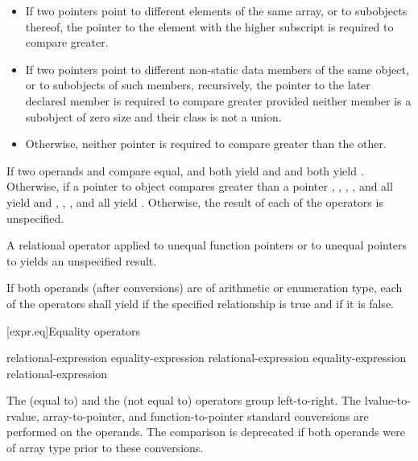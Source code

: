 \begin{itemize}
\item If two pointers point to different elements of the same array, or to
subobjects thereof, the pointer to the element with the higher subscript
is required to compare greater.

\item If two pointers point to different non-static data members of the same
object, or to subobjects of such members, recursively,
the pointer to the later declared member is required to compare greater provided
neither member is a subobject of zero size
and their class is not a union.

\item Otherwise, neither pointer is required to compare greater than the other.

\end{itemize}

\pnum
If two operands  and  compare equal,
 and  both yield  and  and
 both yield . Otherwise, if a pointer to object 
compares greater than a pointer , , ,
, and  all yield  and ,
, , and  all yield .
Otherwise, the result of each of the operators is unspecified.
\begin{note}
A relational operator applied
to unequal function pointers or to unequal pointers to 
yields an unspecified result.
\end{note}

\pnum
If both operands (after conversions) are of arithmetic or enumeration type, each
of the operators shall yield  if the specified relationship is true
and  if it is false.

[expr.eq]{Equality operators}%
%
%

\begin{bnf}
\br
    relational-expression\br
    equality-expression \terminal{==} relational-expression\br
    equality-expression \terminal{!=} relational-expression
\end{bnf}

\pnum
The \tcode{==} (equal to) and the \tcode{!=} (not equal to) operators
group left-to-right.
The
lvalue-to-rvalue,
array-to-pointer,
and function-to-pointer
standard conversions are performed on the operands.
The comparison is deprecated if
both operands were of array type
prior to these conversions.

